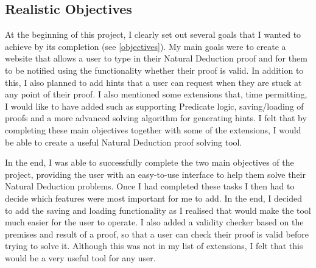 \subsection{Realistic Objectives}

At the beginning of this project, I clearly set out several goals that I wanted to achieve by its completion (see \ref{objectives}). My main goals were to create a website that allows a user to type in their Natural Deduction proof and for them to be notified using the functionality whether their proof is valid. In addition to this, I also planned to add hints that a user can request when they are stuck at any point of their proof. I also mentioned some extensions that, time permitting, I would like to have added such as supporting Predicate logic, saving/loading of proofs and a more advanced solving algorithm for generating hints. I felt that by completing these main objectives together with some of the extensions, I would be able to create a useful Natural Deduction proof solving tool.

In the end, I was able to successfully complete the two main objectives of the project, providing the user with an easy-to-use interface to help them solve their Natural Deduction problems. Once I had completed these tasks I then had to decide which features were most important for me to add. In the end, I decided to add the saving and loading functionality as I realised that would make the tool much easier for the user to operate. I also added a validity checker based on the premises and result of a proof, so that a user can check their proof is valid before trying to solve it. Although this was not in my list of extensions, I felt that this would be a very useful tool for any user. 

